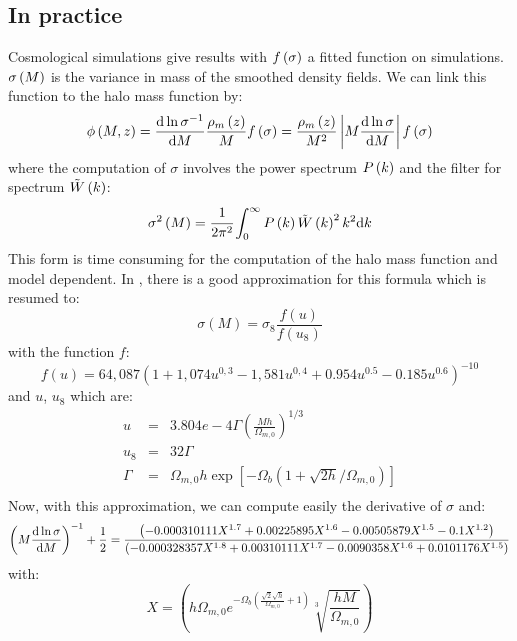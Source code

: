 \subsection{In practice}
%
Cosmological simulations give results with $f\left(\sigma\right)$ a fitted function on
simulations. $\sigma\left({M}\right)$ is the variance in mass of the smoothed density
fields. We can link this function to the halo mass function by:
%
\begin{equation}
    \phi\left({M,z}\right)=\frac{{\rm{d}}\ln{\sigma^{-1}}}{{\rm{d}}{M}}\frac{\rho_m\left({z}\right)}{M}{f\left(\sigma\right)}=\frac{\rho_m\left({z}\right)}{M^2}\left|{{M}\frac{{\rm{d}}\ln\sigma}{{\rm{d}}{M}}}\right|{f\left(\sigma\right)}
\end{equation}
%
where the computation of $\sigma$ involves the power spectrum $P\left({k}\right)$ and
the filter for spectrum $\tilde{W}\left({k}\right)$:
%
\begin{equation}
    \sigma^2\left({M}\right)=\cfrac{1}{2\pi^2}\int_0^\infty{P\left({k}\right)\tilde{W}\left({k}\right)^2{k^2}{\rm{d}}{k}}
\end{equation}
%
This form is time consuming for the computation of the halo mass function and
model dependent. In \cite{2002MNRAS.331...98V}, there is a good approximation
for this formula which is resumed to:
%
\begin{equation}
    \sigma(M)=\sigma_8\frac{f(u)}{f(u_8)}
\end{equation}
%
with the function $f$:
%
\begin{equation}
    f(u)=64,087{(1+1,074{u^{0,3}}-1,581{u^{0,4}}+0.954{u^{0.5}}-0.185{u^{0.6}})}^{-10}
\end{equation}
%
and $u$, $u_8$ which are:
%
\begin{eqnarray}
    u&=&3.804e-4\Gamma\left(\frac{Mh}{\Omega_{m,0}}\right)^{1/3}\nonumber\\
    u_8&=&32\Gamma\nonumber\\
    \Gamma&=&\Omega_{m,0}h\exp\left[{-\Omega_b(1+\sqrt{2h}/\Omega_{m,0})}\right]\nonumber\\
\end{eqnarray}
%
Now, with this approximation, we can compute easily the derivative of $\sigma$
and:
\begin{equation}
    \left({{M}\frac{{\rm{d}}\ln\sigma}{{\rm{d}}{M}}}\right)^{-1}+\frac{1}{2}=\frac{\left(-0.000310111 X^{1.7}+0.00225895 X^{1.6}-0.00505879 X^{1.5}-0.1 X^{1.2}\right)}{\left(-0.000328357 X^{1.8}+0.00310111 X^{1.7}-0.0090358 X^{1.6}+0.0101176 X^{1.5}\right)}
\end{equation}
%
with:
%
%
\begin{equation}
    X=\left(h \Omega _{m,0} e^{-\Omega _b \left(\frac{\sqrt{2} \sqrt{h}}{\Omega _{m,0}}+1\right)} \sqrt[3]{\frac{h M}{\Omega _{m,0}}}\right)
\end{equation}

